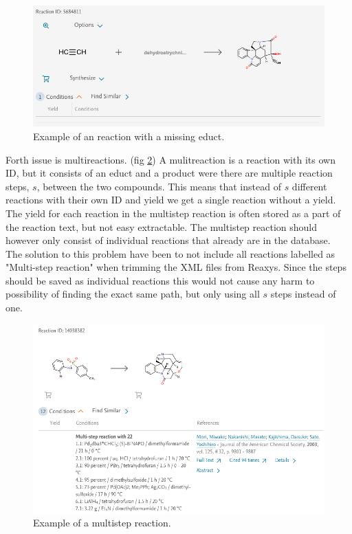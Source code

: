 \documentclass[a4paper,10pt,titlepage]{paper}
\begin{document}
\begin{figure}[H]
\hspace{-1cm}
\includegraphics[scale=0.5]{Billeder/MissingIngredientReaction.png}
\caption{Example of an reaction with a missing educt.}
\label{fig::NoCompound}
\end{figure}

Forth issue is multireactions. (fig \ref{fig::Multistep}) A mulitreaction is a reaction with its own ID, but it consists of an educt and a product were there are multiple reaction steps, $s$, between the two compounds. This means that instead of $s$ different reactions with their own ID and yield we get a single reaction without a yield. The yield for each reaction in the multistep reaction is often stored as a part of the reaction text, but not easy extractable. The multistep reaction should however only consist of individual reactions that already are in the database.\\
The solution to this problem have been to not include all reactions labelled as "Multi-step reaction" when trimming the XML files from Reaxys. Since the steps should be saved as individual reactions this would not cause any harm to possibility of finding the exact same path, but only using all $s$ steps instead of one.

\begin{figure}[H]
\hspace{-1cm}
\includegraphics[scale=0.5]{Billeder/MultistepReactions.png}
\caption{Example of a multistep reaction.}
\label{fig::Multistep}
\end{figure}
\end{document}
